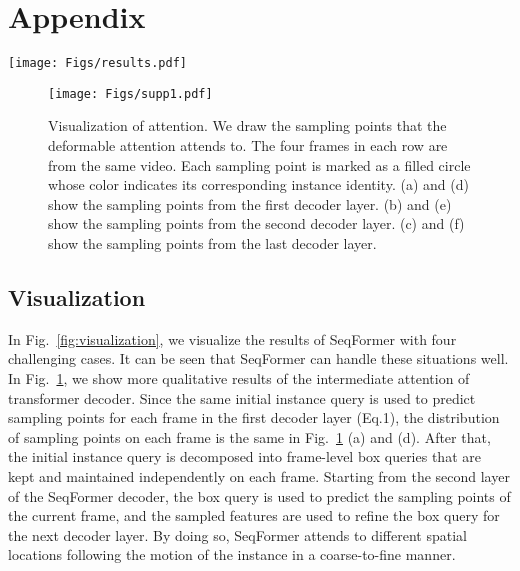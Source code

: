 \documentclass[runningheads]{llncs}
\begin{document}
\clearpage
\appendix
\section{Appendix}



\begin{figure*}[h]
\centering
\texttt{[image: Figs/results.pdf]}
\caption{Visualization of SeqFormer on the YouTube-VIS 2019 validation dataset. The first row shows the instances with various poses. The second row shows the case of a lot of similar instances that are close together with overlapping.
The third row shows the situation where an instance reappears after being occluded while in motion. The last row shows an instance severely occluded by the other instance. The same colors depict the mask sequences of the same instances}
\label{fig:visualization}
\end{figure*}



\begin{figure}[h]
\centering
\texttt{[image: Figs/supp1.pdf]}
\caption{Visualization of attention. We draw the sampling points that the deformable attention attends to. The four frames in each row are from the same video. Each sampling point is marked as a filled circle whose color indicates its corresponding instance identity. (a) and (d) show the sampling points from the first decoder layer. (b) and (e) show the sampling points from the second decoder layer. (c) and (f) show the sampling points from the last decoder layer.}
\label{fig:sampling_points}
\end{figure}



\subsection{Visualization}
\label{sec:visualization}

In Fig.~\ref{fig:visualization}, we visualize the results of SeqFormer with four challenging cases. It can be seen that SeqFormer can handle these situations well.
In Fig.~\ref{fig:sampling_points}, we show more qualitative results of the intermediate attention of transformer decoder. 
Since the same initial instance query is used to predict sampling points for each frame in the first decoder layer (Eq.1), the distribution of sampling points on each frame is the same in Fig.~\ref{fig:sampling_points} (a) and (d). 
After that, the initial instance query is decomposed into frame-level box queries that are kept and maintained independently on each frame.
Starting from the second layer of the SeqFormer decoder, the box query is used to predict the sampling points of the current frame, and the sampled features are used to refine the box query for the next decoder layer.
By doing so, SeqFormer attends to different spatial locations following the motion of the instance in a coarse-to-fine manner.
\end{document}
